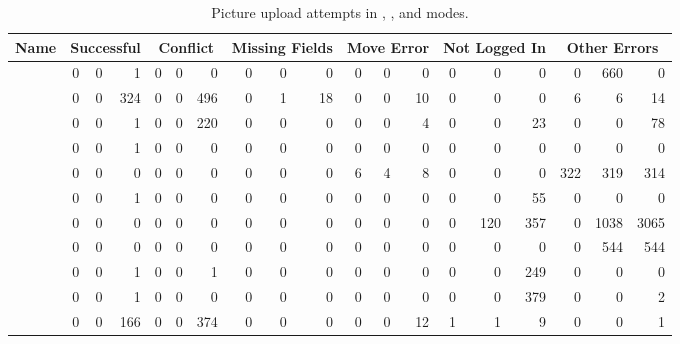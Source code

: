   \begin{table*}[htbp]
    \centering
    {\scriptsize
      \begin{tabular}{|l|rrr|rrr|rrr|rrr|rrr|rrr|}
        \hline
        Name & \multicolumn{3}{|c|}{Successful} & \multicolumn{3}{|c|}{Conflict} & \multicolumn{3}{|c|}{Missing Fields} & \multicolumn{3}{|c|}{Move Error} & \multicolumn{3}{|c|}{Not Logged In} & \multicolumn{3}{|c|}{Other Errors} \\
        \hline
        \acunetix{} & 0&0&1   & 0&0&0   & 0&0&0   & 0&0&0   & 0&0&0   & 0&660&0 \\
        \appscan{} & 0&0&324   & 0&0&496   & 0&1&18   & 0&0&10   & 0&0&0   & 6&6&14 \\
        \burp{} & 0&0&1   & 0&0&220   & 0&0&0   & 0&0&4   & 0&0&23   & 0&0&78 \\
        \grendelscan{} & 0&0&1   & 0&0&0   & 0&0&0   & 0&0&0   & 0&0&0   & 0&0&0 \\
        \hailstorm{} & 0&0&0   & 0&0&0   & 0&0&0   & 6&4&8   & 0&0&0   & 322&319&314 \\
        \milescan{} & 0&0&1   & 0&0&0   & 0&0&0   & 0&0&0   & 0&0&55  & 0&0&0 \\
        \nstalker{} & 0&0&0   & 0&0&0   & 0&0&0   & 0&0&0   & 0&120&357   & 0&1038&3065 \\
        \ntospider{} & 0&0&0   & 0&0&0   & 0&0&0   & 0&0&0   & 0&0&0   & 0&544&544 \\
        \paros{} & 0&0&1   & 0&0&1   & 0&0&0   & 0&0&0   & 0&0&249   & 0&0&0 \\
        \waf{} & 0&0&1   & 0&0&0   & 0&0&0   & 0&0&0   & 0&0&379   & 0&0&2 \\
        \webinspect{} & 0&0&166   & 0&0&374   & 0&0&0   & 0&0&12   & 1&1&9   & 0&0&1 \\
        \hline
      \end{tabular}}
    \caption{Picture upload attempts in \initial, \config, and \manual{} modes.}
  \end{table*}
